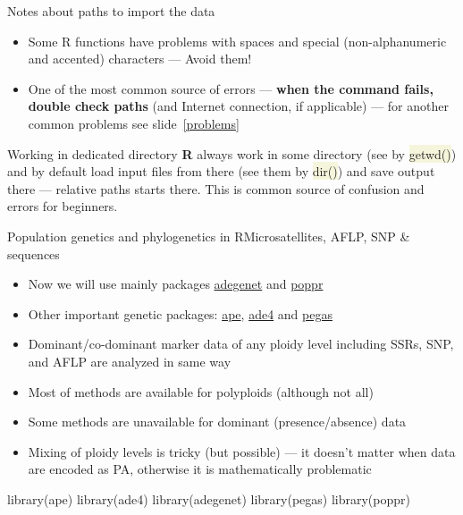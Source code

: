 \documentclass[compress, ucs, xelatex, 11pt, xcolor=svgnames, aspectratio=169,
	hyperref={
		bookmarks=true,
		unicode=true,
		colorlinks=true,
		pdftitle={Molecular data in R},
		plainpages=false,
		pdfauthor={Vojtech Zeisek},
		pdfsubject={Course about phylogeny and evolution in R},
		pdfcreator={XeLaTeX},
		pdfkeywords={R, evolution, phylogeny, molecular data},
		linkcolor=Crimson, %
		anchorcolor=Magenta, %
		citecolor=Magenta, %
		filecolor=Magenta, %
		menucolor=Magenta, %
		urlcolor=DodgerBlue, %
		pdftex},
	url={hyphens, lowtilde} %
	]{beamer}
\renewcommand{\texttt}[1]{\colorbox{Beige}{{\ttfamily #1}}}
\begin{document}
\begin{frame}[allowframebreaks]{Notes about paths to import the data}
\begin{itemize}
\begin{itemize}
		\end{itemize}
		\item Some R functions have problems with spaces and special (non-alphanumeric and accented) characters --- Avoid them!
		\item One of the most common source of errors --- \textbf{when the command fails, double check paths} (and Internet connection, if applicable) --- for another common problems see slide~\ref{problems}
	\end{itemize}
	\begin{alertblock}{Working in dedicated directory}
		\textbf{R} always work in some directory (see by \texttt{getwd()}) and by default load input files from there (see them by \texttt{dir()}) and save output there --- relative paths starts there. This is common source of confusion and errors for beginners.
	\end{alertblock}
\end{frame}

\begin{frame}[fragile]{Population genetics and phylogenetics in R}{Microsatellites, AFLP, SNP \& sequences}
	\begin{multicols}{2}
		\begin{itemize}
			\item Now we will use mainly packages \href{http://adegenet.r-forge.r-project.org/}{adegenet} and \href{https://grunwaldlab.github.io/poppr/}{poppr}
			\item Other important genetic packages: \href{http://ape-package.ird.fr/}{ape}, \href{http://pbil.univ-lyon1.fr/ADE-4/}{ade4} and \href{http://ape-package.ird.fr/pegas.html}{pegas}
			\item Dominant/co-dominant marker data of any ploidy level including SSRs, SNP, and AFLP are analyzed in same way
			\item Most of methods are available for polyploids (although not all)
			\item Some methods are unavailable for dominant (presence/absence) data
			\item Mixing of ploidy levels is tricky (but possible) --- it doesn't matter when data are encoded as PA, otherwise it is mathematically problematic
		\end{itemize}
		\begin{spluscode}
    library(ape)
    library(ade4)
    library(adegenet)
    library(pegas)
    library(poppr)
		\end{spluscode}
	\end{multicols}
\end{frame}
\end{document}

